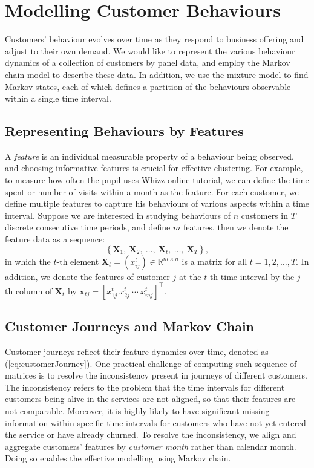 \section{Modelling Customer Behaviours}
\label{sec:model}

Customers' behaviour evolves over time as they respond to business offering and adjust to their own demand. We would like to represent the various behaviour dynamics of a collection of customers by panel data, and employ the Markov chain model to describe these data. In addition, we use the mixture model to find Markov states, each of which defines a partition of the behaviours observable within a single time interval.

\subsection{Representing Behaviours by Features}

A \textit{feature} is an individual measurable property of a behaviour being observed, and choosing informative features is crucial for effective clustering. For example, to measure how often the pupil uses Whizz online tutorial, we can define the time spent or number of visits within a month as the feature. For each customer, we define multiple features to capture his behaviours of various aspects within a time interval. Suppose we are interested in studying behaviours of $n$ customers in $T$ discrete consecutive time periods, and define $m$ features, then we denote the feature data as a sequence:
\begin{equation}
\label{eq:customerJourney}
\left\lbrace \mathbf{X}_1, ~\mathbf{X}_2, ~\dots, ~\mathbf{X}_t, ~\dots, ~\mathbf{X}_T \right\rbrace,
\end{equation}
in which the $t$-th element $\mathbf{X}_t = (x_{ij}^t) \in \mathbb{R}^{m \times n}$ is a matrix for all $t=1,2,\dots,T$. In addition, we denote the features of customer $j$ at the $t$-th time interval by the $j$-th column of $\mathbf{X}_t$ by $\mathbf{x}_{tj} = [x_{1j}^t ~x_{2j}^t ~\cdots ~x_{mj}^t]^\top$.

\subsection{Customer Journeys and Markov Chain}

Customer journeys reflect their feature dynamics over time, denoted as (\ref{eq:customerJourney}). One practical challenge of computing such sequence of matrices is to resolve the inconsistency present in journeys of different customers. The inconsistency refers to the problem that the time intervals for different customers being alive in the services are not aligned, so that their features are not comparable. Moreover, it is highly likely to have significant missing information within specific time intervals for customers who have not yet entered the service or have already churned. To resolve the inconsistency, we align and aggregate customers' features by \textit{customer month} rather than calendar month. Doing so enables the effective modelling using Markov chain.

